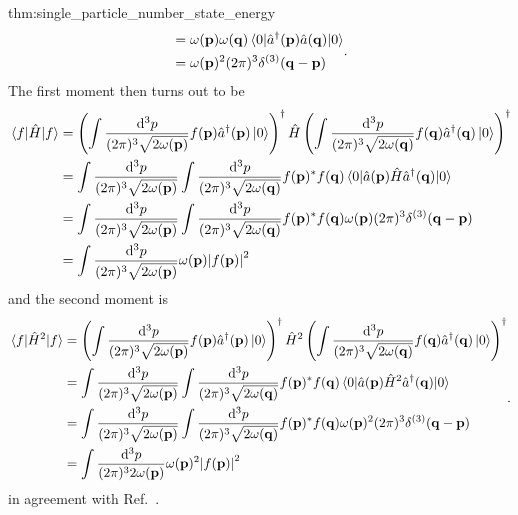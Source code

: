 \begin{delayedproof}{thm:single_particle_number_state_energy}
\begin{equation}
\begin{split}
			&=
			\omega(\vb{p})
			\omega(\vb{q})
			\expval{
				\hat{a}^\dagger(\vb{p})
				\hat{a}(\vb{q})
			}{0}
			\\
			&=
			\omega(\vb{p})^2
			(2\pi)^3
			\delta^{(3)}(\vb{q}-\vb{p})
		\end{split}
		.
	\end{equation}
	The first moment then turns out to be
	\begin{equation}
		\begin{split}
			\expval{\hat{H}}{f}
			&=
			\left(
				\int\frac{\dd[3]{p}}{(2\pi)^3\sqrt{2\omega(\vb{p})}}
				f(\vb{p})
				\hat{a}^\dagger(\vb{p})
				\ket{0}
			\right)^\dagger
			\hat{H}
			\left(
				\int\frac{\dd[3]{p}}{(2\pi)^3\sqrt{2\omega(\vb{q})}}
				f(\vb{q})
				\hat{a}^\dagger(\vb{q})
				\ket{0}
			\right)^\dagger
			\\
			&=
			\int\frac{\dd[3]{p}}{(2\pi)^3\sqrt{2\omega(\vb{p})}}
			\int\frac{\dd[3]{p}}{(2\pi)^3\sqrt{2\omega(\vb{q})}}
			f(\vb{p})^*
			f(\vb{q})
			\expval{
				\hat{a}(\vb{p})
				\hat{H}
				\hat{a}^\dagger(\vb{q})
			}{0}
			\\
			&=
			\int\frac{\dd[3]{p}}{(2\pi)^3\sqrt{2\omega(\vb{p})}}
			\int\frac{\dd[3]{p}}{(2\pi)^3\sqrt{2\omega(\vb{q})}}
			f(\vb{p})^*
			f(\vb{q})		
			\omega(\vb{p})
			(2\pi)^3\delta^{(3)}(\vb{q}-\vb{p})
			\\
			&=
			\int\frac{\dd[3]{p}}{(2\pi)^3\sqrt{2\omega(\vb{p})}}
			\omega(\vb{p})
			\abs{f(\vb{p})}^2
		\end{split}
	\end{equation}
	and the second moment is
	\begin{equation}
		\begin{split}
			\expval{\hat{H}^2}{f}
			&=
			\left(
				\int\frac{\dd[3]{p}}{(2\pi)^3\sqrt{2\omega(\vb{p})}}
				f(\vb{p})
				\hat{a}^\dagger(\vb{p})
				\ket{0}
			\right)^\dagger
			\hat{H}^2
			\left(
				\int\frac{\dd[3]{p}}{(2\pi)^3\sqrt{2\omega(\vb{q})}}
				f(\vb{q})
				\hat{a}^\dagger(\vb{q})
				\ket{0}
			\right)^\dagger
			\\
			&=
			\int\frac{\dd[3]{p}}{(2\pi)^3\sqrt{2\omega(\vb{p})}}
			\int\frac{\dd[3]{p}}{(2\pi)^3\sqrt{2\omega(\vb{q})}}
			f(\vb{p})^*
			f(\vb{q})
			\expval{
				\hat{a}(\vb{p})
				\hat{H}^2
				\hat{a}^\dagger(\vb{q})
			}{0}
			\\
			&=
			\int\frac{\dd[3]{p}}{(2\pi)^3\sqrt{2\omega(\vb{p})}}
			\int\frac{\dd[3]{p}}{(2\pi)^3\sqrt{2\omega(\vb{q})}}
			f(\vb{p})^*
			f(\vb{q})
			\omega(\vb{p})^2
			(2\pi)^3
			\delta^{(3)}(\vb{q}-\vb{p})
			\\
			&=
			\int\frac{\dd[3]{p}}{(2\pi)^32\omega(\vb{p})}
			\omega(\vb{p})^2
			\abs{f(\vb{p})}^2
		\end{split}
		.
	\end{equation}
	in agreement with Ref.~\cite[eqs.~10 and 11]{Naumov2013}.
\end{delayedproof}

